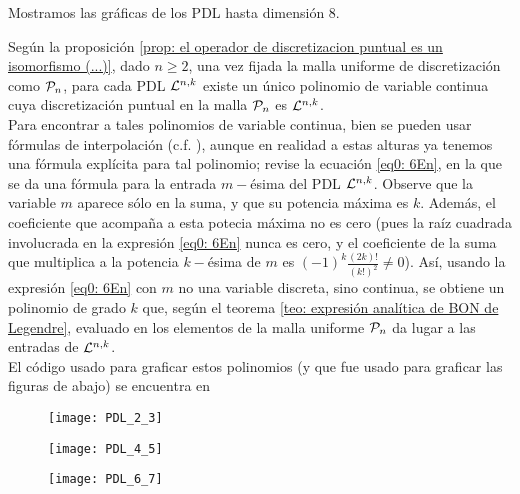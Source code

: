 Mostramos las gráficas de los PDL hasta dimensión $8$.
 
\begin{nota}
Según la proposición 
\ref{prop: el operador de discretizacion puntual es un isomorfismo (...)},
dado $n \geq 2$,
una vez fijada la malla uniforme de discretización
como $\mathcal{P}_{n}$,
para cada PDL $\mathcal{L}^{n,k}$
existe un único polinomio de variable
continua cuya discretización puntual en la
malla $\mathcal{P}_{n}$ es $\mathcal{L}^{n,k}$. \\
Para encontrar a 
tales polinomios 
de variable continua, bien se pueden usar
fórmulas de interpolación (c.f. 
\cite{interpolation}), aunque en realidad
a estas alturas ya tenemos una fórmula explícita 
para tal polinomio; revise la ecuación
\eqref{eq0: 6En}, en la que se da una fórmula
para la entrada $m-$ésima del
PDL $\mathcal{L}^{n,k}$. Observe que la 
variable $m$ aparece sólo en la suma, 
y que su potencia máxima es
$k$. Además, el coeficiente que acompaña
a esta potecia máxima no es cero (pues la raíz
cuadrada involucrada en la
expresión \eqref{eq0: 6En} nunca es cero,
y el coeficiente de la suma que multiplica
a la potencia $k-$ésima de $m$ es
$(-1)^{k} \frac{(2k)!}{(k!)^{2}} \neq 0$). 
Así, usando la expresión 
\eqref{eq0: 6En} con $m$ no una variable discreta,
sino continua, se obtiene un polinomio
de grado $k$ que, según el teorema 
\ref{teo: expresión analítica de BON de Legendre}, evaluado
en los elementos de la malla uniforme $\mathcal{P}_{n}$
da lugar a las entradas de $\mathcal{L}^{n,k}$. \\

El código usado  para graficar estos polinomios
(y que fue usado para graficar las figuras de abajo)
se encuentra en 
\end{nota} 
 
\begin{figure}[H]
 	\centering
 	\texttt{[image: PDL\_2\_3]} 
 \end{figure}	 
 \begin{figure}[H]
 	\centering
 	\texttt{[image: PDL\_4\_5]} 
 \end{figure}	
 \begin{figure}[H]
 	\centering
 	\texttt{[image: PDL\_6\_7]} 
 \end{figure}	